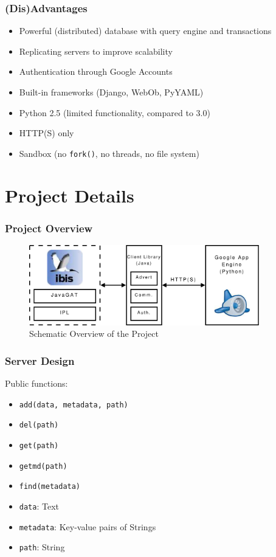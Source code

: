 \documentclass{beamer}
\begin{document}
\frame
{
	\frametitle{(Dis)Advantages}
	\begin{itemize}
		\item <1->Powerful (distributed) database with query engine and
			transactions
		\item <1->Replicating servers to improve scalability 
		\item <1->Authentication through Google Accounts
		\item <1->Built-in frameworks (Django, WebOb, PyYAML)
	\end{itemize}

	\begin{itemize}
		\item <2->Python 2.5 (limited functionality, compared to 3.0)
		\item <2->HTTP(S) only
		\item <2->Sandbox (no \texttt{fork()}, no threads, no file system)
	\end{itemize}
}

\section{Project Details}
\frame
{
	\frametitle{Project Overview}
	\begin{figure}
	\begin{center}
	\includegraphics[width=10cm]{proj_design.pdf} 
	\caption{Schematic Overview of the Project}
	\end{center}
	\end{figure}
}

\frame
{
	\frametitle{Server Design}
	Public functions:
	\begin{itemize}
		\item <1->\texttt{add(data, metadata, path)}
		\item <1->\texttt{del(path)}
		\item <1->\texttt{get(path)}
		\item <1->\texttt{getmd(path)}
		\item <1->\texttt{find(metadata)}
	\end{itemize}
	\begin{itemize}
		\item <2->\texttt{data}: Text
		\item <2->\texttt{metadata}: Key-value pairs of Strings
		\item <2->\texttt{path}: String
	\end{itemize}
}
\end{document}
